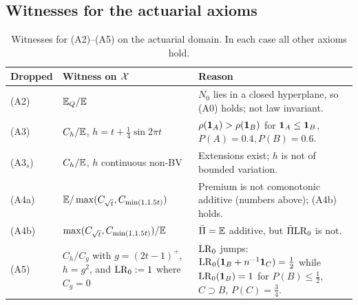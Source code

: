 \subsection{Witnesses for the actuarial axioms}\label{supp:actwit}

\begin{table}[ht]
\centering\small
\begin{tabularx}{\textwidth}{@{}l>{\raggedright\arraybackslash}p{4.6cm}>{\raggedright\arraybackslash}X@{}}
\toprule
\textbf{Dropped} & \textbf{Witness on $\mathcal X$} & \textbf{Reason}\\
\midrule
(A2) & $\mathbb E_Q/\mathbb E$ & $N_0$ lies in a closed hyperplane, so (A0) holds; not law invariant.\\
(A3) & $C_h/\mathbb E$, $h=t+\tfrac14\sin2\pi t$ & $\rho(\mathbf 1_A)>\rho(\mathbf 1_B)$ for $\mathbf 1_A\le\mathbf 1_B$, $P(A)=0.4,P(B)=0.6$.\\
(A3$_s$) & $C_h/\mathbb E$, $h$ continuous non-BV & Extensions exist; $h$ is not of bounded variation.\\
(A4a) & $\mathbb E/\max(C_{\sqrt t},C_{\min(1,1.5t)})$ & Premium is not comonotonic additive (numbers above); (A4b) holds.\\
(A4b) & $\max(C_{\sqrt t},C_{\min(1,1.5t)})/\mathbb E$ & $\bar\Pi=\mathbb E$ additive, but $\bar\Pi\mathrm{LR}_0$ is not.\\
(A5) & $C_h/C_g$ with $g=(2t-1)^+$, $h=g^2$, and $\mathrm{LR}_0:=1$ where $C_g=0$ & $\mathrm{LR}_0$ jumps: $\mathrm{LR}_0(\mathbf 1_B+n^{-1}\mathbf 1_C)=\tfrac12$ while $\mathrm{LR}_0(\mathbf 1_B)=1$ for $P(B)\le\tfrac12$, $C\supset B$, $P(C)=\tfrac34$.\\
\bottomrule
\end{tabularx}
\caption{Witnesses for (A2)--(A5) on the actuarial domain. In each case all other axioms hold.}\label{ex:A5}
\end{table}